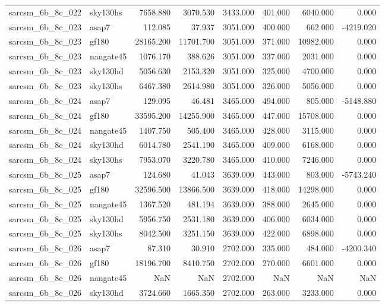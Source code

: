 \begin{tabular}{llrrrrrr}
sarcsm\_6b\_8c\_022 & sky130hs & 7658.880 & 3070.530 & 3433.000 & 401.000 & 6040.000 & 0.000 \\
sarcsm\_6b\_8c\_023 & asap7 & 112.085 & 37.937 & 3051.000 & 400.000 & 662.000 & -4219.020 \\
sarcsm\_6b\_8c\_023 & gf180 & 28165.200 & 11701.700 & 3051.000 & 371.000 & 10982.000 & 0.000 \\
sarcsm\_6b\_8c\_023 & nangate45 & 1076.170 & 388.626 & 3051.000 & 337.000 & 2031.000 & 0.000 \\
sarcsm\_6b\_8c\_023 & sky130hd & 5056.630 & 2153.320 & 3051.000 & 325.000 & 4700.000 & 0.000 \\
sarcsm\_6b\_8c\_023 & sky130hs & 6467.380 & 2614.980 & 3051.000 & 326.000 & 5056.000 & 0.000 \\
sarcsm\_6b\_8c\_024 & asap7 & 129.095 & 46.481 & 3465.000 & 494.000 & 805.000 & -5148.880 \\
sarcsm\_6b\_8c\_024 & gf180 & 33595.200 & 14255.900 & 3465.000 & 447.000 & 15708.000 & 0.000 \\
sarcsm\_6b\_8c\_024 & nangate45 & 1407.750 & 505.400 & 3465.000 & 428.000 & 3115.000 & 0.000 \\
sarcsm\_6b\_8c\_024 & sky130hd & 6014.780 & 2541.190 & 3465.000 & 409.000 & 6168.000 & 0.000 \\
sarcsm\_6b\_8c\_024 & sky130hs & 7953.070 & 3220.780 & 3465.000 & 410.000 & 7246.000 & 0.000 \\
sarcsm\_6b\_8c\_025 & asap7 & 124.680 & 41.043 & 3639.000 & 443.000 & 803.000 & -5743.240 \\
sarcsm\_6b\_8c\_025 & gf180 & 32596.500 & 13866.500 & 3639.000 & 418.000 & 14298.000 & 0.000 \\
sarcsm\_6b\_8c\_025 & nangate45 & 1367.520 & 481.194 & 3639.000 & 388.000 & 2645.000 & 0.000 \\
sarcsm\_6b\_8c\_025 & sky130hd & 5956.750 & 2531.180 & 3639.000 & 406.000 & 6034.000 & 0.000 \\
sarcsm\_6b\_8c\_025 & sky130hs & 8042.500 & 3251.150 & 3639.000 & 422.000 & 6898.000 & 0.000 \\
sarcsm\_6b\_8c\_026 & asap7 & 87.310 & 30.910 & 2702.000 & 335.000 & 484.000 & -4200.340 \\
sarcsm\_6b\_8c\_026 & gf180 & 18196.700 & 8410.750 & 2702.000 & 270.000 & 6601.000 & 0.000 \\
sarcsm\_6b\_8c\_026 & nangate45 & NaN & NaN & 2702.000 & NaN & NaN & NaN \\
sarcsm\_6b\_8c\_026 & sky130hd & 3724.660 & 1665.350 & 2702.000 & 263.000 & 3233.000 & 0.000 \\

\end{tabular}
